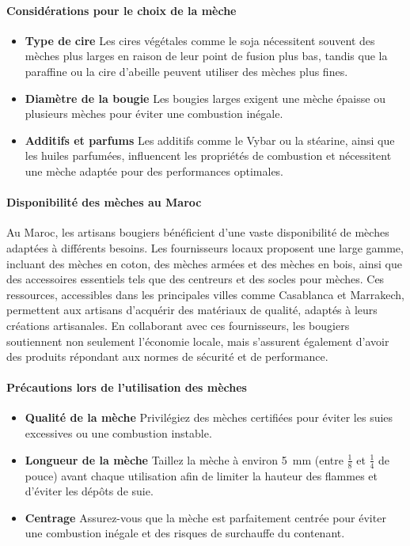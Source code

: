 \documentclass[11pt,fleqn,onecolumn,oneside]{book}
\begin{document}
\paragraph{Considérations pour le choix de la mèche}

\begin{itemize}
    \item \textbf{Type de cire} Les cires végétales comme le soja nécessitent souvent des mèches plus larges en raison de leur point de fusion plus bas, tandis que la paraffine ou la cire d’abeille peuvent utiliser des mèches plus fines.
    \item \textbf{Diamètre de la bougie} Les bougies larges exigent une mèche épaisse ou plusieurs mèches pour éviter une combustion inégale. 
    \item \textbf{Additifs et parfums} Les additifs comme le Vybar ou la stéarine, ainsi que les huiles parfumées, influencent les propriétés de combustion et nécessitent une mèche adaptée pour des performances optimales.
\end{itemize}

\paragraph{Disponibilité des mèches au Maroc}

Au Maroc, les artisans bougiers bénéficient d’une vaste disponibilité de mèches adaptées à différents besoins. Les fournisseurs locaux proposent une large gamme, incluant des mèches en coton, des mèches armées et des mèches en bois, ainsi que des accessoires essentiels tels que des centreurs et des socles pour mèches. Ces ressources, accessibles dans les principales villes comme Casablanca et Marrakech, permettent aux artisans d'acquérir des matériaux de qualité, adaptés à leurs créations artisanales. En collaborant avec ces fournisseurs, les bougiers soutiennent non seulement l'économie locale, mais s'assurent également d'avoir des produits répondant aux normes de sécurité et de performance.

\paragraph{Précautions lors de l’utilisation des mèches}

\begin{itemize}
    \item \textbf{Qualité de la mèche} Privilégiez des mèches certifiées pour éviter les suies excessives ou une combustion instable.
    \item \textbf{Longueur de la mèche} Taillez la mèche à environ \SI{5}{\milli\meter} (entre \(\frac{1}{8}\) et \(\frac{1}{4}\) de pouce) avant chaque utilisation afin de limiter la hauteur des flammes et d'éviter les dépôts de suie.
    
    \item \textbf{Centrage} Assurez-vous que la mèche est parfaitement centrée pour éviter une combustion inégale et des risques de surchauffe du contenant.
\end{itemize}
\end{document}
